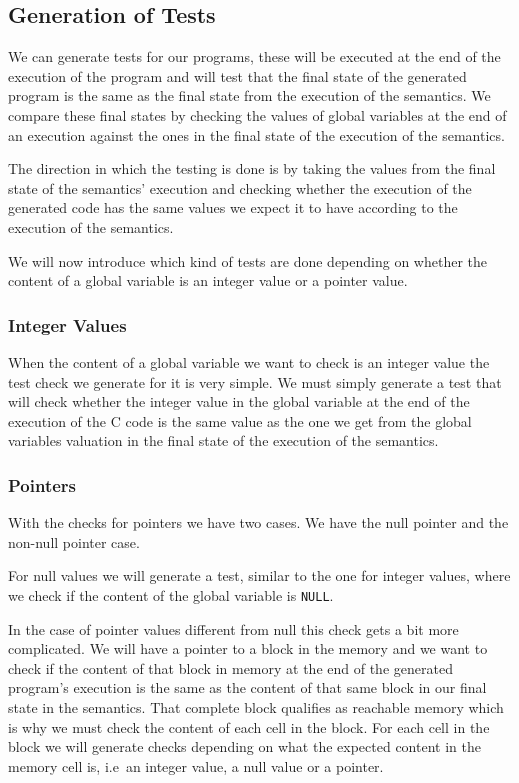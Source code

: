 \subsection{Generation of Tests}

We can generate tests for our programs, these will be executed at the end of the execution of the program and will test that the final state of the generated program is the same as the final state from the execution of the semantics.
We compare these final states by checking the values of global variables at the end of an execution against the ones in the final state of the execution of the semantics.

The direction in which the testing is done is by taking the values from the final state of the semantics' execution and checking whether the execution of the generated code has the same values we expect it to have according to the execution of the semantics.

We will now introduce which kind of tests are done depending on whether the content of a global variable is an integer value or a pointer value.

\subsubsection{Integer Values}

When the content of a global variable we want to check is an integer value the test check we generate for it is very simple.
We must simply generate a test that will check whether the integer value in the global variable at the end of the execution of the C code is the same value as the one we get from the global variables valuation in the final state of the execution of the semantics.

\subsubsection{Pointers}

With the checks for pointers we have two cases.
We have the null pointer and the non-null pointer case.

For null values we will generate a test, similar to the one for integer values, where we check if the content of the global variable is \verb|NULL|.

In the case of pointer values different from null this check gets a bit more complicated.
We will have a pointer to a block in the memory and we want to check if the content of that block in memory at the end of the generated program's execution is the same as the content of that same block in our final state in the semantics.
That complete block qualifies as reachable memory which is why we must check the content of each cell in the block.
For each cell in the block we will generate checks depending on what the expected content in the memory cell is, i.e\ an integer value, a null value or a pointer.

